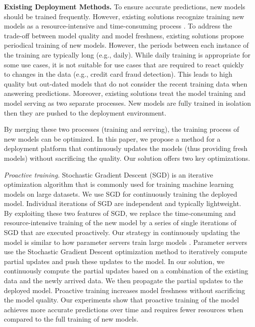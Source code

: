 \textbf{Existing Deployment Methods.} 
To ensure accurate predictions, new models should be trained frequently.
However, existing solutions recognize training new models as a resource-intensive and time-consuming process \cite{crankshaw2014missing, agarwal2014laser, baylor2017tfx}.
To address the trade-off between model quality and model freshness, existing solutions propose periodical training of new models.
However, the periods between each instance of the training are typically long (e.g., daily).
While daily training is appropriate for some use cases, it is not suitable for use cases that are required to react quickly to changes in the data (e.g., credit card fraud detection).
This leads to high quality but out-dated models that do not consider the recent training data when answering predictions.
Moreover, existing solutions treat the model training and model serving as two separate processes. 
New models are fully trained in isolation then they are pushed to the deployment environment.

By merging these two processes (training and serving), the training process of new models can be optimized.
In this paper, we propose a method for a deployment platform that continuously updates the models (thus providing fresh models) without sacrificing the quality.
Our solution offers two key optimizations.

\textit{Proactive training.}
Stochastic Gradient Descent (SGD) is an iterative optimization algorithm that is commonly used for training machine learning models on large datasets.
We use SGD for continuously training the deployed model.
Individual iterations of SGD are independent and typically lightweight.
By exploiting these two features of SGD, we replace the time-consuming and resource-intensive training of the new model by a series of single iterations of SGD that are executed proactively.
Our strategy in continuously updating the model is similar to how parameter servers train large models \cite{li2014scaling}.
Parameter servers use the Stochastic Gradient Descent optimization method to iteratively compute partial updates and push these updates to the model.
In our solution, we continuously compute the partial updates based on a combination of the existing data and the newly arrived data.
We then propagate the partial updates to the deployed model.
Proactive training increases model freshness without sacrificing the model quality.
Our experiments show that proactive training of the model achieves more accurate predictions over time and requires fewer resources when compared to the full training of new models.

